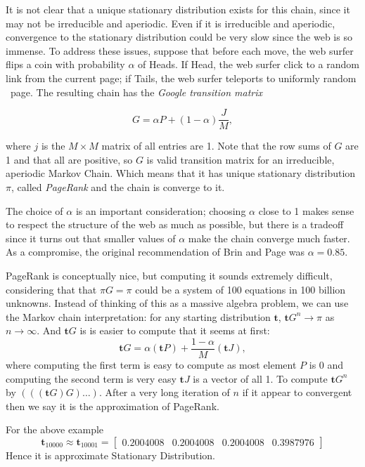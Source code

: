 It is not clear that a unique stationary distribution exists for this chain, 
since it may not be irreducible and aperiodic. 
Even if it is irreducible and aperiodic, convergence
to the stationary distribution could be very slow since the web is so immense. To
address these issues, suppose that before each move, the web surfer flips a coin
with probability $ \alpha $ of Heads. If Head, the web surfer click to a random 
link from the current page; if Tails, the web surfer teleports to uniformly random \
page. The resulting chain has the \textit{Google transition matrix}

\begin{equation}
    \label{google transition matrix}
    G = \alpha P + (1-\alpha) \frac{J}{M},
\end{equation}

where $ j $ is the  $ M\times M $ matrix of all entries are 1. Note that the row sums 
of $ G $ are 1 and that all are positive, so  $ G$ is valid transition matrix for an 
irreducible, aperiodic Markov Chain. Which means that it has unique stationary 
distribution $ \pi $, called \textit{PageRank} and the chain is converge to it.
 
The choice of $\alpha$ is an important consideration; 
choosing $ \alpha $ close to 1 makes sense to respect the structure of the
web as much as possible, but there is a tradeoff since it turns out that smaller
values of $ \alpha $ make the chain converge much faster. 
As a compromise, the original recommendation of Brin and Page was $\alpha = 0.85$.

PageRank is conceptually nice, but computing it sounds extremely difficult, considering
that that $ \pi G=\pi $ could be a system of 100 equations in 100 billion unknowns.
Instead of thinking of this as a massive algebra problem, we can use the Markov
chain interpretation: for any starting distribution  $ \mathbf{t} $,  
$\mathbf{t}G^{n}\to \pi$ as $ n\to\infty $. And $ \mathbf{t}G $ is is easier to 
compute that it seems at first:
 \[
     \mathbf{t}G = \alpha(\mathbf{t}P) +\frac{1-\alpha}{M}(\mathbf{t}J),
\]
where computing the first term is easy to compute as most element $ P $  is 0 and 
computing the second term is very easy $ \mathbf{t}J $ is a vector of all 1. 
To compute $ \mathbf{t}G^{n} $ by $ (((\mathbf{t}G)G)\ldots) $. After a very long 
iteration of $ n $ if it appear to convergent then we say  it is the approximation
of PageRank.

For the above example 
\[
    \mathbf{t}_{10000}\approx\mathbf{t}_{10001} = 
    \begin{bmatrix}
        0.2004008 & 0.2004008 & 0.2004008 & 0.3987976 
    \end{bmatrix} 
\]
Hence it is approximate Stationary Distribution.


